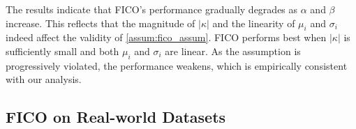 \documentclass{article}
\theoremstyle{plain}
\theoremstyle{definition}
\theoremstyle{remark}
\begin{document}
The results indicate that FICO's performance gradually degrades as $\alpha$ and $\beta$ increase. This reflects that the magnitude of $|\kappa|$ and the linearity of $\mu_i$ and $\sigma_i$ indeed affect the validity of \cref{assum:fico_assum}. FICO performs best when $|\kappa|$ is sufficiently small and both $\mu_i$ and $\sigma_i$ are linear. As the assumption is progressively violated, the performance weakens, which is empirically consistent with our analysis.

\subsection{{FICO on Real-world Datasets}}
\label{app:d_real_world}

\begin{table}
\vspace{-12mm}
\caption{ODR on real-world datasets for different methods. The best is bolded.}
\vspace{-4mm}
\label{tab:multivariate-realworld}
\begin{center}
\end{center}
\vspace{-10mm}
\end{table}%
\end{document}
